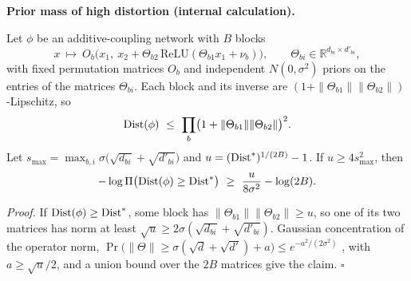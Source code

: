 \documentclass[11pt,a4paper]{article}
\newenvironment{keybox}[1]{%
  \def\FrameCommand{{\color{ccalc}\vrule width 1.6pt}\hspace{8pt}}%
  \MakeFramed{\advance\hsize-\width\FrameRestore}%
  \noindent\textbf{#1}\par\smallskip\noindent\ignorespaces}{\endMakeFramed}
\begin{document}
\begin{keybox}{Prior mass of high distortion (internal calculation).}
Let $\phi$ be an additive-coupling network \cite{dinh2015,gomez2017} with $B$
blocks
\[
x\ \mapsto\ O_b\bigl(x_1,\ x_2+\Theta_{b2}\,\mathrm{ReLU}(\Theta_{b1}x_1+\nu_b)\bigr),
\qquad \Theta_{bi}\in\mathbb R^{d_{bi}\times d'_{bi}},
\]
with fixed permutation matrices $O_b$ and independent $N(0,\sigma^2)$ priors
on the entries of the matrices $\Theta_{bi}$. Each block and
its inverse are $(1+\|\Theta_{b1}\|\|\Theta_{b2}\|)$-Lipschitz, so
\[
\Dist(\phi)\ \le\ \prod_b\bigl(1+\|\Theta_{b1}\|\|\Theta_{b2}\|\bigr)^2 .
\]
Let
$s_{\max}=\max_{b,i}\sigma\bigl(\sqrt{d_{bi}}+\sqrt{d'_{bi}}\bigr)$ and
$u=(\operatorname{Dist}^*)^{1/(2B)}-1$. If $u\ge4s_{\max}^2$, then
\begin{equation}
-\log\Pi\bigl(\operatorname{Dist}(\phi)\ge \operatorname{Dist}^*\bigr)\ \ge\ \frac{u}{8\sigma^2}-\log(2B).
\label{eq:topo-prior}
\end{equation}
\end{keybox}

\noindent\emph{Proof.} If $\operatorname{Dist}(\phi)\ge \operatorname{Dist}^*$, some block has
$\|\Theta_{b1}\|\|\Theta_{b2}\|\ge u$, so one of its two matrices has norm at
least $\sqrt u\ge2\sigma(\sqrt{d_{bi}}+\sqrt{d'_{bi}})$. Gaussian
concentration of the operator norm,
$\Pr\bigl(\|\Theta\|\ge\sigma(\sqrt{d}+\sqrt{d'})+a\bigr)\le e^{-a^2/(2\sigma^2)}$
\cite{vershynin2018}, with $a\ge\sqrt u/2$, and a union bound over the $2B$
matrices give the claim. $\square$
\end{document}
